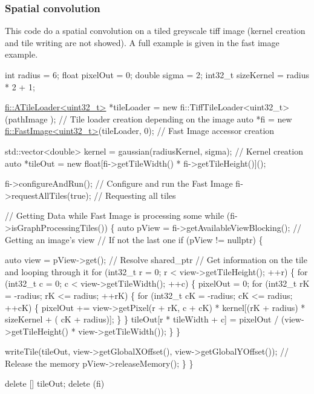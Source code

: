 \subsubsection*{Spatial convolution}

This code do a spatial convolution on a tiled greyscale tiff image (kernel creation and tile writing are not showed). A full example is given in the fast image example. 
\begin{DoxyCode}
\textcolor{keywordtype}{int} radius = 6;
\textcolor{keywordtype}{float} pixelOut = 0;
\textcolor{keywordtype}{double} sigma = 2;
int32\_t sizeKernel = radius * 2 + 1;


\hyperlink{classfi_1_1ATileLoader}{fi::ATileLoader<uint32\_t>} *tileLoader = \textcolor{keyword}{new} fi::TiffTileLoader<uint32\_t>(pathImage
      ); \textcolor{comment}{// Tile loader creation depending on the image}
\textcolor{keyword}{auto} *fi = \textcolor{keyword}{new} \hyperlink{classfi_1_1FastImage}{fi::FastImage<uint32\_t>}(tileLoader, 0); \textcolor{comment}{// Fast Image accessor
       creation}

std::vector<double> kernel = gaussian(radiusKernel, sigma); \textcolor{comment}{// Kernel creation }
\textcolor{keyword}{auto} *tileOut = \textcolor{keyword}{new} \textcolor{keywordtype}{float}[fi->getTileWidth() * fi->getTileHeight()]();

fi->configureAndRun(); \textcolor{comment}{// Configure and run the Fast Image}
fi->requestAllTiles(\textcolor{keyword}{true}); \textcolor{comment}{// Requesting all tiles }

\textcolor{comment}{// Getting Data while Fast Image is processing some}
\textcolor{keywordflow}{while} (fi->isGraphProcessingTiles()) \{
    \textcolor{keyword}{auto} pView = fi->getAvailableViewBlocking(); \textcolor{comment}{// Getting an image's view }
    \textcolor{comment}{// If not the last one}
    \textcolor{keywordflow}{if} (pView != \textcolor{keyword}{nullptr}) \{

        \textcolor{keyword}{auto} view = pView->get(); \textcolor{comment}{// Resolve shared\_ptr}
        \textcolor{comment}{// Get information on the tile and looping through it }
        \textcolor{keywordflow}{for} (int32\_t r = 0; r < view->getTileHeight(); ++r) \{
            \textcolor{keywordflow}{for} (int32\_t c = 0; c < view->getTileWidth(); ++c) \{
                pixelOut = 0;
                \textcolor{keywordflow}{for} (int32\_t rK = -radius; rK <= radius; ++rK) \{
                    \textcolor{keywordflow}{for} (int32\_t cK = -radius; cK <= radius; ++cK) \{
                        pixelOut += view->getPixel(r + rK, c + cK) * kernel[(rK + radius) * sizeKernel + (
      cK + radius)];
                    \}
                \}
                tileOut[r * tileWidth + c] = pixelOut / (view->getTileHeight() * view->getTileWidth());
            \}
        \}

        writeTile(tileOut, view->getGlobalXOffset(), view->getGlobalYOffset());
        \textcolor{comment}{// Release the memory}
        pView->releaseMemory();
    \}
\}

\textcolor{keyword}{delete} [] tileOut;
\textcolor{keyword}{delete} (fi)
\end{DoxyCode}


